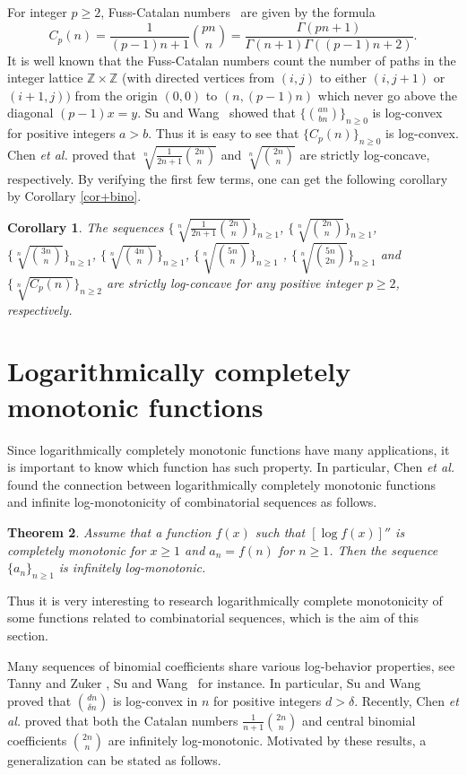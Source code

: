 \documentclass[12pt,reqno]{article}
\newtheorem{thm}{Theorem}[section]
\newtheorem{cor}[thm]{Corollary}
\theoremstyle{definition}
\numberwithin{equation}{section}
\begin{document}
For integer $p\geq 2$, Fuss-Catalan numbers~\cite{HP} are given by
the formula
$$C_p(n)=\frac{1}{(p-1)n+1}\binom{pn}{n}=\frac{\Gamma(pn+1)}{\Gamma(n+1)\Gamma((p-1)n+2)}.$$
It is well known that the Fuss-Catalan numbers count the number of
paths in the integer lattice $\mathbb{Z}\times \mathbb{Z}$ (with
directed vertices from $(i,j)$ to either $(i,j+1)$ or $(i+1,j))$
from the origin $(0,0)$ to $(n,(p-1)n)$ which never go above the
diagonal $(p-1)x=y$. Su and Wang~\cite{SW08} showed that
$\{\binom{an}{bn}\}_{n\geq 0}$ is log-convex for positive integers
$a>b$. Thus it is easy to see that $\{C_p(n)\}_{n\geq 0}$ is
log-convex. Chen {\it et al.} \cite{CGW1} proved that
$\sqrt[n]{\frac{1}{2n+1}\binom{2n}{n}}$ and
$\sqrt[n]{\binom{2n}{n}}$ are strictly log-concave, respectively. By
verifying the first few terms, one can get the following corollary
by Corollary \ref{cor+bino}.
\begin{cor}
The sequences $\{\sqrt[n]{\frac{1}{2n+1}\binom{2n}{n}}\}_{n\geq1}$,
$\{\sqrt[n]{\binom{2n}{n}}\}_{n\geq1}$,
$\{\sqrt[n]{\binom{3n}{n}}\}_{n\geq1}$,
$\{\sqrt[n]{\binom{4n}{n}}\}_{n\geq1}$,
$\{\sqrt[n]{\binom{5n}{n}}\}_{n\geq1}$ ,
$\{\sqrt[n]{\binom{5n}{2n}}\}_{n\geq1}$ and
$\{\sqrt[n]{C_p(n)}\}_{n\geq2}$ are strictly log-concave for any
positive integer $p\geq2$, respectively.
\end{cor}
\section{Logarithmically completely monotonic functions}
Since logarithmically completely monotonic functions have many
applications, it is important to know which function has such
property. In particular, Chen {\it et al.} \cite{CGW1} found the
connection between logarithmically completely monotonic functions
and infinite log-monotonicity of combinatorial sequences as follows.
\begin{thm}\label{thm+chen}\cite{CGW1}
 Assume that a function $f(x)$ such
that $[\log f(x)]''$ is completely monotonic for $x \geq 1$ and $a_n
= f(n)$ for $n \geq 1$. Then the sequence $\{a_n\}_{n\geq1}$ is
infinitely log-monotonic.
\end{thm}
Thus it is very interesting to research logarithmically complete
monotonicity of some functions related to combinatorial sequences,
which is the aim of this section.


Many sequences of binomial coefficients share various log-behavior
properties, see Tanny and Zuker \cite{TZ74,TZ76}, Su and
Wang~\cite{SW08} for instance. In particular, Su and Wang proved
that $\binom{dn}{\delta n}$ is log-convex in $n$ for positive
integers $d>\delta$. Recently, Chen {\it et al.} \cite{CGW1} proved
that both the Catalan numbers $\frac{1}{n+1}\binom{2n}{n}$ and
central binomial coefficients $\binom{2n}{n}$ are infinitely
log-monotonic. Motivated by these results, a generalization can be
stated as follows.
\end{document}
